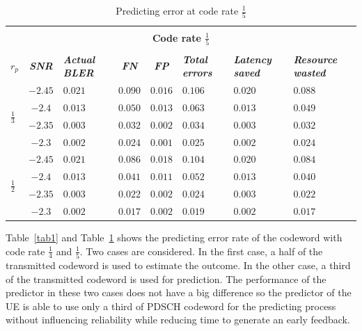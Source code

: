 \documentclass[conference]{IEEEtran}
\begin{document}
\begin{table}[htbp]
\caption{Predicting error at code rate $\frac{1}{5}$}
\begin{center}
\begin{tabular}{ |p{0.5em}|c|p{2em}|c|c|p{2.5em}|p{2.5em}|p{3em}|}
 \hline
 \multicolumn{8}{|c|}{} \\[-1em]
 \multicolumn{8}{|c|}{\textbf{Code rate $\frac{1}{5}$}} \\
 \multicolumn{8}{|c|}{} \\[-1em]
 \hline
\textbf{\textit{$r_{p}$}} & \textbf{\textit{SNR}} &\textbf{\textit{Actual BLER}} &\textbf{\textit{FN}} &\textbf{\textit{FP}} &\textbf{\textit{Total errors}} &\textbf{\textit{Latency saved}}&\textbf{\textit{Resource wasted}} \\
 \hline
  \multirow{4}{1em}{\centering $\frac{1}{3}$} & $-2.45$ & $0.021$&$0.090 $ &$0.016 $ &$0.106$ &$0.020$ &$0.088$\\\cline{2-8}
  & $-2.4$ &$0.013$ &$0.050$ &$0.013$ &$0.063$&$0.013$ & $0.049$\\\cline{2-8}
& $-2.35$ &$0.003$  &$0.032$ &$0.002$ &$0.034$&$0.003$ &$0.032$  \\\cline{2-8}
& $-2.3$ &$0.002$ &$0.024$ &$0.001$ &$0.025$&$0.002$ & $0.024$\\\cline{2-8}
  \hline
 \multirow{4}{1em}{\centering $\frac{1}{2}$} & $-2.45$ & $0.021$&$0.086$ &$0.018$ &$0.104$&$0.020$ &$0.084$ \\\cline{2-8}
 & $-2.4$ & $0.013$&$0.041$ &$0.011$ &$0.052$&$0.013$ &$0.040$ \\\cline{2-8}
 & $-2.35$ &$0.003$ &$0.022$ &$0.002$ &$0.024$ &$0.003$ &$0.022$\\\cline{2-8}
& $-2.3$ &$0.002$ &$0.017$ &$0.002$ &$0.019$&$0.002$ &$0.017$ \\\cline{2-8}


 \hline
\end{tabular}
\label{tab2}
\end{center}
\end{table}

Table~\ref{tab1} and Table~\ref{tab2} shows the predicting error rate of the codeword with code rate $\frac{1}{4}$ and $\frac{1}{5}$. Two cases are considered. In the first case, a half of the transmitted codeword is used to estimate the outcome. In the other case, a third of the transmitted codeword is used for prediction. The performance of the predictor in these two cases does not have a big difference so the predictor of the UE is able to use only a third of PDSCH codeword for the predicting process without influencing reliability while reducing time to generate an early feedback.
\end{document}

